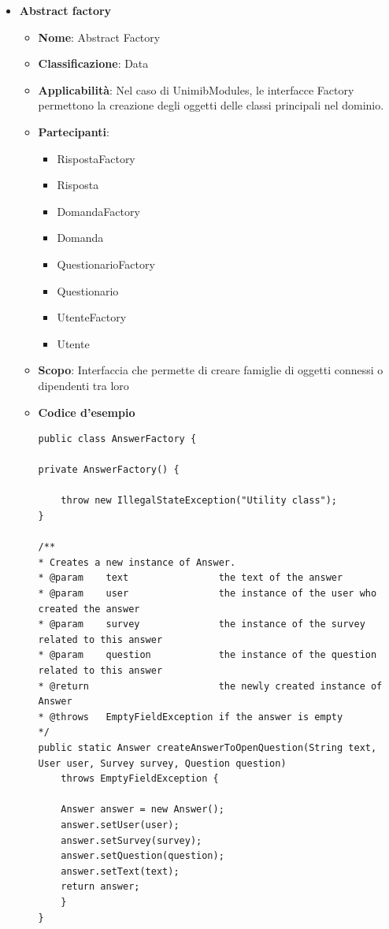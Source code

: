 \documentclass[12pt]{article}
\begin{document}
\begin{itemize}
		
		\item \textbf{Abstract factory}
		\begin{itemize}
		\item \textbf{Nome}: Abstract Factory
            \item \textbf{Classificazione}: Data
            \item \textbf{Applicabilità}: Nel caso di UnimibModules, le interfacce Factory permettono la creazione degli oggetti delle classi principali nel dominio.
            \item \textbf{Partecipanti}:
                \begin{itemize}
                    \item RispostaFactory
                    \item Risposta
                    \item DomandaFactory
                    \item Domanda
                    \item QuestionarioFactory
                    \item Questionario
                    \item UtenteFactory
                    \item Utente
                \end{itemize}
            \item \textbf{Scopo}: Interfaccia che permette di creare famiglie di oggetti connessi o dipendenti tra loro
            \item \textbf{Codice d'esempio}
            \begin{lstlisting}
public class AnswerFactory {

private AnswerFactory() {

    throw new IllegalStateException("Utility class");
}

/**
* Creates a new instance of Answer.
* @param	text				the text of the answer
* @param	user				the instance of the user who created the answer
* @param	survey				the instance of the survey related to this answer
* @param	question			the instance of the question related to this answer
* @return						the newly created instance of Answer
* @throws	EmptyFieldException	if the answer is empty
*/
public static Answer createAnswerToOpenQuestion(String text, User user, Survey survey, Question question)
    throws EmptyFieldException {
    
    Answer answer = new Answer();
    answer.setUser(user);
    answer.setSurvey(survey);
    answer.setQuestion(question);
    answer.setText(text);
    return answer;
    }
}
            \end{lstlisting}
        \end{itemize}
		

\end{itemize}
\end{document}
